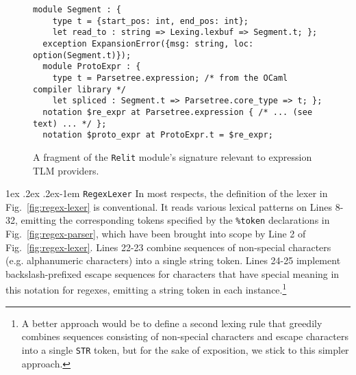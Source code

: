\documentclass[acmsmall]{acmart}
\makeatletter
\renewcommand{\subsubsection}{%
  \@startsection{subsubsection}{3}%
  {\z@}{1ex \@plus .2ex \@minus .2ex}{-1em}%
  {\normalfont\normalsize\bfseries}%
}
\newcommand{\li}[1]{\lstinline[basicstyle=\ttfamily\fontsize{9pt}{1em}\selectfont]{#1}}
\makeatother
\begin{document}
\begin{figure}
\begin{lstlisting}[deletekeywords={spliced}]
  module Segment : { 
    type t = {start_pos: int, end_pos: int};
    let read_to : string => Lexing.lexbuf => Segment.t; };
  exception ExpansionError({msg: string, loc: option(Segment.t)});
  module ProtoExpr : { 
    type t = Parsetree.expression; /* from the OCaml compiler library */
    let spliced : Segment.t => Parsetree.core_type => t; };
  notation $re_expr at Parsetree.expression { /* ... (see text) ... */ };
  notation $proto_expr at ProtoExpr.t = $re_expr;
\end{lstlisting}
\vspace{-2px}
\caption{A fragment of the \li{Relit} module's signature relevant to expression TLM providers.}
\label{fig:relit-util}
\vspace{-5px}
\end{figure}

\subsubsection{\li{RegexLexer}}
\label{sec:regex-lexer}
In most respects, the definition of the lexer in Fig.~\ref{fig:regex-lexer} is conventional. It reads various lexical patterns on Lines 8-32, emitting the corresponding tokens specified by the \lstinline[morekeywords={token}]{%token} declarations in Fig.~\ref{fig:regex-parser}, which have been brought into scope by Line 2 of Fig.~\ref{fig:regex-lexer}. Lines 22-23 combine sequences of non-special characters (e.g. alphanumeric characters) into a single string token. Lines 24-25 implement backslash-prefixed escape sequences for characters that have special meaning in this notation for regexes, emitting a string token in each instance.\footnote{A better approach would be to define a second lexing rule that greedily combines sequences consisting of non-special characters and escape characters into a single \li{STR} token, but for the sake of exposition, we stick to this simpler approach.}  
\end{document}
